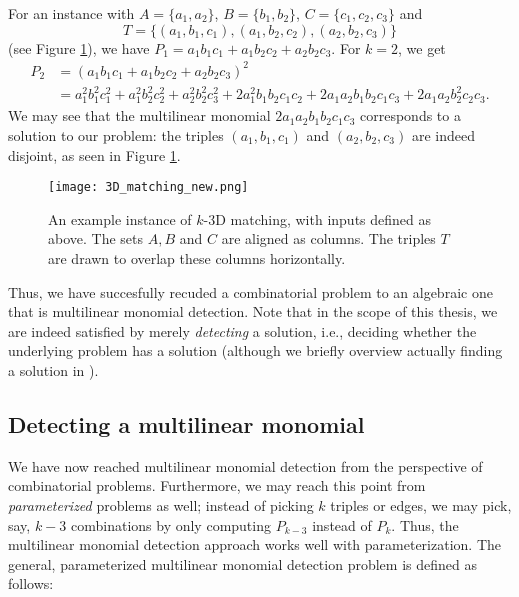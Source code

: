 For an instance with $A = \{a_1, a_2\}$, $B = \{b_1, b_2\}$, $C = \{c_1, c_2,
c_3\}$ and 
\[
  T = \{(a_1, b_1, c_1), (a_1, b_2, c_2), (a_2, b_2, c_3)\}
\]
(see Figure \ref{fig:3D_matching}), 
we have $P_1 = a_1b_1c_1 + a_1b_2c_2 + a_2b_2c_3$. For $k=2$, we get 
\begin{align*}
  P_2 &= (a_1b_1c_1 + a_1b_2c_2 + a_2b_2c_3)^2 \\
  &= a_1^2b_1^2c_1^2 + a_1^2b_2^2c_2^2 + a_2^2b_2^2c_3^2 + 
  2a_1^2b_1b_2c_1c_2 + 2a_1a_2b_1b_2c_1c_3 + 2 a_1a_2b_2^2c_2c_3.
\end{align*}
We may see that the multilinear monomial $2a_1a_2b_1b_2c_1c_3$ corresponds 
to a solution to our problem: the triples $(a_1,b_1,c_1)$ and $(a_2,b_2,c_3)$ are 
indeed disjoint, as seen in Figure \ref{fig:3D_matching}.
%
\begin{figure}[h]
  \texttt{[image: 3D\_matching\_new.png]}
  \centering
  \caption{An example instance of $k$-3D matching, with inputs defined 
  as above. The sets $A, B$ and $C$ are aligned as columns. 
  The triples $T$ are drawn to overlap these columns horizontally.}
  \label{fig:3D_matching}
\end{figure}

Thus, we have succesfully recuded a combinatorial problem to an 
algebraic one that is multilinear monomial detection. 
Note that in the scope of this thesis, we 
are indeed satisfied by merely \emph{detecting} a solution, i.e., deciding whether 
the underlying problem has a solution (although we briefly overview 
actually finding a solution in ).

\subsection{Detecting a multilinear monomial}
\label{sect:problem_definition}

We have now reached multilinear monomial detection from the perspective 
of combinatorial problems. Furthermore, we may reach this point from 
\emph{parameterized} problems as well; instead of picking $k$ triples or edges, 
we may pick, say, $k-3$ combinations by only computing $P_{k-3}$ instead of $P_k$. 
Thus, the multilinear monomial detection approach works well with parameterization. 
The general, parameterized multilinear monomial detection problem is defined as follows: 

\begin{problem}
\end{problem}

